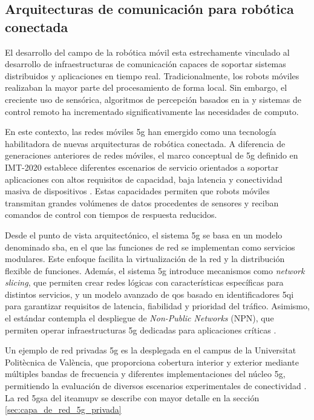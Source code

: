 \subsection{Arquitecturas de comunicación para robótica conectada}
\label{sec:arquitecturas_de_comunicacion_para_robotica_conectada}

El desarrollo del campo de la robótica móvil esta estrechamente vinculado al desarrollo de infraestructuras de comunicación capaces de soportar sistemas distribuidos y aplicaciones en tiempo real. Tradicionalmente, los robots móviles realizaban la mayor parte del procesamiento de forma local. Sin embargo, el creciente uso de sensórica, algoritmos de percepción basados en \gls{ia} y sistemas de control remoto ha incrementado significativamente las necesidades de computo.

En este contexto, las redes móviles \gls{5g} han emergido como una tecnología habilitadora de nuevas arquitecturas de robótica conectada. A diferencia de generaciones anteriores de redes móviles, el marco conceptual de \gls{5g} definido en IMT-2020 establece diferentes escenarios de servicio orientados a soportar aplicaciones con altos requisitos de capacidad, baja latencia y conectividad masiva de dispositivos \cite{3gppTS23501}. Estas capacidades permiten que robots móviles transmitan grandes volúmenes de datos procedentes de sensores y reciban comandos de control con tiempos de respuesta reducidos.

Desde el punto de vista arquitectónico, el sistema \gls{5g} se basa en un modelo denominado \gls{sba}, en el que las funciones de red se implementan como servicios modulares. Este enfoque facilita la virtualización de la red y la distribución flexible de funciones. Además, el sistema \gls{5g} introduce mecanismos como \textit{network slicing}, que permiten crear redes lógicas con características específicas para distintos servicios, y un modelo avanzado de \gls{qos} basado en identificadores \gls{5qi} para garantizar requisitos de latencia, fiabilidad y prioridad del tráfico. Asimismo, el estándar contempla el despliegue de \textit{Non-Public Networks} (NPN), que permiten operar infraestructuras \gls{5g} dedicadas para aplicaciones críticas \cite{3gppTS23501}.

Un ejemplo de red privadas \gls{5g} es la desplegada en el campus de la Universitat Politècnica de València, que proporciona cobertura interior y exterior mediante múltiples bandas de frecuencia y diferentes implementaciones del núcleo \gls{5g}, permitiendo la evaluación de diversos escenarios experimentales de conectividad \cite{ITEAM2025Private5G}. La red \gls{5gsa} del \gls{iteamupv} se describe con mayor detalle en la sección \ref{sec:capa_de_red_5g_privada}


